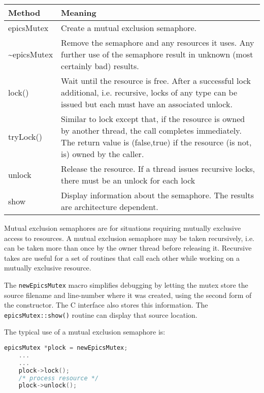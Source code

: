 \begin{center}
\begin{longtable}{p{1.25in}p{4.5in}}
\textbf{Method} & \textbf{Meaning}\\
\hline
epicsMutex &
Create a mutual exclusion semaphore.\\

\~{}epicsMutex &
Remove the semaphore and any resources it uses.
Any further use of the semaphore result in unknown (most certainly bad) results.\\

lock() &
Wait until the resource is free.
After a successful lock additional, i.e. recursive, locks of any type can be issued but each must have an associated unlock.\\

tryLock() &
Similar to lock except that, if the resource is owned by another thread, the call completes immediately.
The return value is (false,true) if the resource (is not, is) owned by the caller.\\

unlock &
Release the resource.
If a thread issues recursive locks, there must be an unlock for each lock\\

show &
Display information about the semaphore.
The results are architecture dependent.
\end{longtable}

\end{center}


Mutual exclusion semaphores are for situations requiring mutually exclusive access to resources.
A mutual exclusion semaphore may be taken recursively, i.e. can be taken more than once by the owner thread before releasing it.
Recursive takes are useful for a set of routines that call each other while working on a mutually exclusive resource.

The \verb|newEpicsMutex| macro simplifies debugging by letting the mutex store the source filename and line-number where it was created, using the second form of the constructor.
The C interface also stores this information.
The \verb|epicsMutex::show()| routine can display that source location.

The typical use of a mutual exclusion semaphore is:

\begin{lstlisting}[language=C++]
    epicsMutex *plock = newEpicsMutex;
    ...
    ...
    plock->lock();
    /* process resource */
    plock->unlock();
\end{lstlisting}

